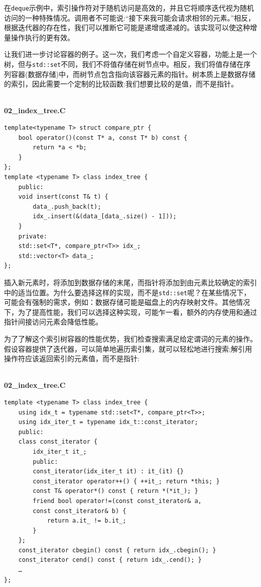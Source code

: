 在\texttt{deque}示例中，索引操作符对于随机访问是高效的，并且它将顺序迭代视为随机访问的一种特殊情况。调用者不可能说:“接下来我可能会请求相邻的元素。”相反，根据迭代器的存在性，我们可以推断它可能是递增或递减的。该实现可以使这种增量操作执行的更有效。

让我们进一步讨论容器的例子。这一次，我们考虑一个自定义容器，功能上是一个树，但与\texttt{std::set}不同，我们不将值存储在树节点中。相反，我们将值存储在序列容器(数据存储)中，而树节点包含指向该容器元素的指针。树本质上是数据存储的索引，因此需要一个定制的比较函数:我们想要比较的是值，而不是指针。

\hspace*{\fill} \\ %
\noindent
\textbf{02\_index\_tree.C}
\begin{lstlisting}[style=styleCXX]
template<typename T> struct compare_ptr {
	bool operator()(const T* a, const T* b) const {
		return *a < *b;
	}
};
template <typename T> class index_tree {
	public:
	void insert(const T& t) { 
		data_.push_back(t);
		idx_.insert(&(data_[data_.size() - 1]));
	}
	private:
	std::set<T*, compare_ptr<T>> idx_;
	std::vector<T> data_;
};
\end{lstlisting}

插入新元素时，将添加到数据存储的末尾，而指针将添加到由元素比较确定的索引中的适当位置。为什么要选择这样的实现，而不是\texttt{std::set}呢？在某些情况下，可能会有强制的需求，例如：数据存储可能是磁盘上的内存映射文件。其他情况下，为了提高性能，我们可以选择这种实现，可能乍一看，额外的内存使用和通过指针间接访问元素会降低性能。 

为了了解这个索引树容器的性能优势，我们检查搜索满足给定谓词的元素的操作。假设容器提供了迭代器，可以简单地遍历索引集，就可以轻松地进行搜索;解引用操作符应该返回索引的元素值，而不是指针:

\hspace*{\fill} \\ %
\noindent
\textbf{02\_index\_tree.C}
\begin{lstlisting}[style=styleCXX]
template <typename T> class index_tree {
	using idx_t = typename std::set<T*, compare_ptr<T>>;
	using idx_iter_t = typename idx_t::const_iterator;
	public:
	class const_iterator {
		idx_iter_t it_;
		public:
		const_iterator(idx_iter_t it) : it_(it) {}
		const_iterator operator++() { ++it_; return *this; }
		const T& operator*() const { return *(*it_); }
		friend bool operator!=(const const_iterator& a,
		const const_iterator& b) {
			return a.it_ != b.it_;
		}
	};
	const_iterator cbegin() const { return idx_.cbegin(); }
	const_iterator cend() const { return idx_.cend(); }
	…
};
\end{lstlisting}

